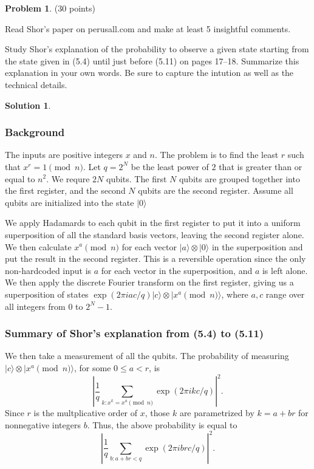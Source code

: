 \documentclass{article}
\theoremstyle{definition}
\newtheorem{problem}{Problem}
\newtheorem*{solution}{Solution}
\newcommand{\ket}[1]{|#1\rangle}
\begin{document}
\begin{problem} (30 points) 
\begin{compactenum}[(a)]
\item Read Shor's paper on perusall.com and make at least 5 insightful comments. 
\item Study Shor's explanation of the probability to observe a given state starting from the state given in (5.4) until just before (5.11) on pages 17--18. Summarize this explanation in your own words. Be sure to capture the intution as well as the technical details. 
\end{compactenum}
\end{problem}
\begin{solution}

\subsubsection*{Background}
The inputs are positive integers $x$ and $n$.  The problem is to find the least $r$ such that $x^r = 1 \pmod{n}$.  Let $q = 2^N$ be the least power of $2$ that is greater than or equal to $n^2$.  We requre $2N$ qubits.  The first $N$ qubits are grouped together into the first register, and the second $N$ qubits are the second register.  Assume all qubits are initialized into the state $\ket{0}$

We apply Hadamards to each qubit in the first register to put it into a uniform superposition of all the standard basis vectors, leaving the second register alone. We then calculate $x^a \pmod{n}$ for each vector $\ket{a}\otimes \ket{0}$ in the superposition and put the result in the second register.  This is a reversible operation since the only non-hardcoded input is $a$ for each vector in the superposition, and $a$ is left alone. We then apply the discrete Fourier transform on the first register, giving us a superposition of states $\exp(2\pi i a c/q) \ket{c} \otimes \ket{x^a \pmod{n}}$, where $a,c$ range over all integers from $0$ to $2^N-1$.  

\subsubsection*{Summary of Shor's explanation from (5.4) to (5.11)}

We then take a measurement of all the qubits.  The probability of measuring $\ket{c} \otimes \ket{x^a \pmod{n}}$, for some $0 \le a < r$, is
$$ \left| \frac{1}{q} \sum_{k: x^k = x^a \pmod{n}} \exp(2\pi i k c/q) \right|^2.$$ 
Since $r$ is the multplicative order of $x$, those $k$ are parametrized by $k = a + br$ for nonnegative integers $b$.  Thus, the above probability is equal to
$$ \left| \frac{1}{q} \sum_{b: a + br < q} \exp(2\pi i  b r c/q) \right|^2.$$ 


\end{solution}
\end{document}
